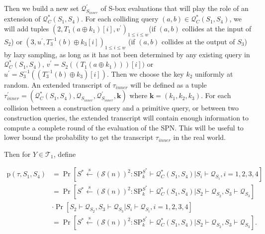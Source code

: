 Then we build a new set $\mathcal{Q}_{S_{inner}}^{\prime}$ of S-box evaluations that will play the role of an extension of $\mathcal{Q}_{C}^{*}\left(S_{1}, S_{4}\right)$. For each colliding query $(a, b) \in \mathcal{Q}_{C}^{*}\left(S_{1}, S_{4}\right)$, we will add tuples $\left(2, T_1\left(a \oplus k_{1}\right)[i], v^{\prime}\right)_{1 \leq i \leq w}$(if $(a, b)$ collides at the input of $S_2$) or $\left(3, u^{\prime}, T_{3}^{-1}\left(b\right) \oplus k_{3}[i]\right)_{1 \leq i \leq w}$ (if $(a, b)$ collides at the output of $S_3$) by lazy sampling, as long as it has not been determined by any existing query in $\mathcal{Q}_{C}^{*}\left(S_{1}, S_{4}\right)$, $v^{\prime}=S_{2}(\left(T_1\left(a \oplus k_{1}\right)\right))[i])$ or $u^{\prime}=S_{3}^{-1}(\left(T_{3}^{-1}\left(b\right) \oplus k_{3}\right)[i])$. Then we choose the key $k_2$ uniformly at random. An extended transcript of $\tau_{inner}$ will be defined as a tuple $\tau_{inner}^{\prime}=\left(\mathcal{Q}_{C}^{*}\left(S_{1}, S_{4}\right), \mathcal{Q}_{S_{inner}}, \mathcal{Q}_{S_{inner}}^{\prime}, \mathbf{k}\right)$ where $\mathbf{k}=\left(k_{1}, k_{2}, k_{3}\right)$. For each collision between a construction query and a primitive query, or between two construction queries, the extended transcript will contain enough information to compute a complete round of the evaluation of the SPN. This will be useful to lower bound the probability to get the transcript $\tau_{inner}$ in the real world.


Then for $Y \in \mathcal{T}_{1}$, define

\begin{equation}
\begin{aligned}
\mathrm{p}\left(\tau, S_{1}, S_{4}\right)&=\operatorname{Pr}\left[S^{*} \stackrel{\mathrm{s}}{\leftarrow}(\mathcal{S}(n))^{2}:
\mathrm{SP}_{k}^{S^{*}} \vdash \mathcal{Q}_{C}^{*}\left(S_{1}, S_{4}\right) | S_{i} \vdash \mathcal{Q}_{S_{i}}, i=1,2,3,4\right] \\
&=\operatorname{Pr}\left[S^{*} \stackrel{\mathrm{s}}{\leftarrow}(\mathcal{S}(n))^{2}: \mathrm{SP}_{k}^{S^{*}} \vdash \mathcal{Q}_{C}^{*}\left(S_{1},
S_{4}\right) | S_{2} \vdash \mathcal{Q}_{S_{2}}, S_{3} \vdash \mathcal{Q}_{S_{3}}\right] \\
& \cdot \operatorname{Pr}\left[S_{2} \vdash \mathcal{Q}_{S_{2}}, S_{3} \vdash \mathcal{Q}_{S_{3}}| S_{i} \vdash \mathcal{Q}_{S_{i}}, i=1,2,3,4\right]\\
&=\operatorname{Pr}\left[S^{*} \stackrel{\mathrm{s}}{\leftarrow}(\mathcal{S}(n))^{2}: \mathrm{SP}_{k}^{S^{*}} \vdash \mathcal{Q}_{C}^{*}\left(S_{1},
S_{4}\right) | S_{2} \vdash \mathcal{Q}_{S_{2}}, S_{3} \vdash \mathcal{Q}_{S_{3}}\right].
\end{aligned}
\end{equation}

